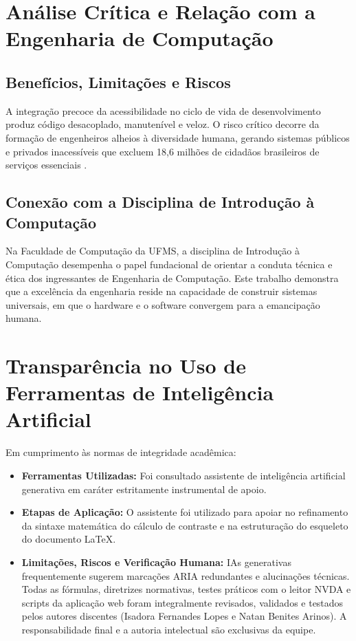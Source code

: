 \documentclass[12pt,a4paper]{article}
\begin{document}
\section{Análise Crítica e Relação com a Engenharia de Computação}

\subsection{Benefícios, Limitações e Riscos}
A integração precoce da acessibilidade no ciclo de vida de desenvolvimento produz código desacoplado, manutenível e veloz. O risco crítico decorre da formação de engenheiros alheios à diversidade humana, gerando sistemas públicos e privados inacessíveis que excluem 18,6 milhões de cidadãos brasileiros de serviços essenciais \cite{ibge_pnad2022}.

\subsection{Conexão com a Disciplina de Introdução à Computação}
Na Faculdade de Computação da UFMS, a disciplina de Introdução à Computação desempenha o papel fundacional de orientar a conduta técnica e ética dos ingressantes de Engenharia de Computação. Este trabalho demonstra que a excelência da engenharia reside na capacidade de construir sistemas universais, em que o hardware e o software convergem para a emancipação humana.

\section{Transparência no Uso de Ferramentas de Inteligência Artificial}
Em cumprimento às normas de integridade acadêmica:
\begin{itemize}
    \item \textbf{Ferramentas Utilizadas:} Foi consultado assistente de inteligência artificial generativa em caráter estritamente instrumental de apoio.
    \item \textbf{Etapas de Aplicação:} O assistente foi utilizado para apoiar no refinamento da sintaxe matemática do cálculo de contraste e na estruturação do esqueleto do documento LaTeX.
    \item \textbf{Limitações, Riscos e Verificação Humana:} IAs generativas frequentemente sugerem marcações ARIA redundantes e alucinações técnicas. Todas as fórmulas, diretrizes normativas, testes práticos com o leitor NVDA e scripts da aplicação web foram integralmente revisados, validados e testados pelos autores discentes (Isadora Fernandes Lopes e Natan Benites Arinos). A responsabilidade final e a autoria intelectual são exclusivas da equipe.
\end{itemize}
\end{document}
